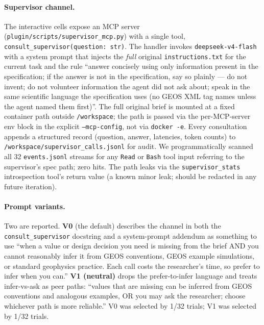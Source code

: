 \documentclass{article}
\begin{document}
\paragraph{Supervisor channel.} The interactive cells expose an MCP server (\texttt{plugin/scripts/supervisor\_mcp.py}) with a single tool, \texttt{consult\_supervisor(question: str)}. The handler invokes \texttt{deepseek-v4-flash} with a system prompt that injects the \emph{full} original \texttt{instructions.txt} for the current task and the rule ``answer concisely using only information present in the specification; if the answer is not in the specification, say so plainly --- do not invent; do not volunteer information the agent did not ask about; speak in the same scientific language the specification uses (no GEOS XML tag names unless the agent named them first)''. The full original brief is mounted at a fixed container path outside \texttt{/workspace}; the path is passed via the per-MCP-server env block in the explicit \texttt{--mcp-config}, not via \texttt{docker -e}. Every consultation appends a structured record (question, answer, latencies, token counts) to \texttt{/workspace/supervisor\_calls.jsonl} for audit. We programmatically scanned all 32 \texttt{events.jsonl} streams for any \texttt{Read} or \texttt{Bash} tool input referring to the supervisor's spec path; zero hits. The path leaks via the \texttt{supervisor\_stats} introspection tool's return value (a known minor leak; should be redacted in any future iteration).

\paragraph{Prompt variants.} Two are reported. \textbf{V0} (the default) describes the channel in both the \texttt{consult\_supervisor} docstring and a system-prompt addendum as something to use ``when a value or design decision you need is missing from the brief AND you cannot reasonably infer it from GEOS conventions, GEOS example simulations, or standard geophysics practice. Each call costs the researcher's time, so prefer to infer when you can.'' \textbf{V1 (neutral)} drops the prefer-to-infer language and treats infer-vs-ask as peer paths: ``values that are missing can be inferred from GEOS conventions and analogous examples, OR you may ask the researcher; choose whichever path is more reliable.'' V0 was selected by 1/32 trials; V1 was selected by 1/32 trials.
\end{document}
